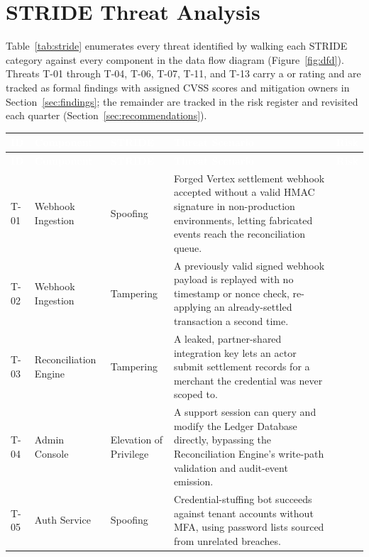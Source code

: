 \section{STRIDE Threat Analysis}
\label{sec:stride-analysis}

Table~\ref{tab:stride} enumerates every threat identified by walking each STRIDE category against every component in the data flow diagram (Figure~\ref{fig:dfd}). Threats T-01 through T-04, T-06, T-07, T-11, and T-13 carry a \critical{} or \highrisk{} rating and are tracked as formal findings with assigned CVSS scores and mitigation owners in Section~\ref{sec:findings}; the remainder are tracked in the risk register and revisited each quarter (Section~\ref{sec:recommendations}).

{\footnotesize
\setlength{\tabcolsep}{4pt}
\begin{longtable}{@{}P{7mm}P{25mm}P{22mm}P{68mm}c@{}}
\toprule
{}
\textcolor{white}{\textbf{ID}} & \textcolor{white}{\textbf{Component}} & \textcolor{white}{\textbf{STRIDE}} & \textcolor{white}{\textbf{Threat Scenario}} & \textcolor{white}{\textbf{Risk}} \\
\midrule
\endfirsthead
\toprule
{}
\textcolor{white}{\textbf{ID}} & \textcolor{white}{\textbf{Component}} & \textcolor{white}{\textbf{STRIDE}} & \textcolor{white}{\textbf{Threat Scenario}} & \textcolor{white}{\textbf{Risk}} \\
\midrule
\endhead
T-01 & Webhook Ingestion & Spoofing & Forged Vertex settlement webhook accepted without a valid HMAC signature in non-production environments, letting fabricated events reach the reconciliation queue. & \critical{} \\
T-02 & Webhook Ingestion & Tampering & A previously valid signed webhook payload is replayed with no timestamp or nonce check, re-applying an already-settled transaction a second time. & \highrisk{} \\
T-03 & Reconciliation Engine & Tampering & A leaked, partner-shared integration key lets an actor submit settlement records for a merchant the credential was never scoped to. & \highrisk{} \\
T-04 & Admin Console & Elevation of Privilege & A support session can query and modify the Ledger Database directly, bypassing the Reconciliation Engine's write-path validation and audit-event emission. & \critical{} \\
T-05 & Auth Service & Spoofing & Credential-stuffing bot succeeds against tenant accounts without MFA, using password lists sourced from unrelated breaches. & \mediumrisk{} \\

\end{longtable}}
